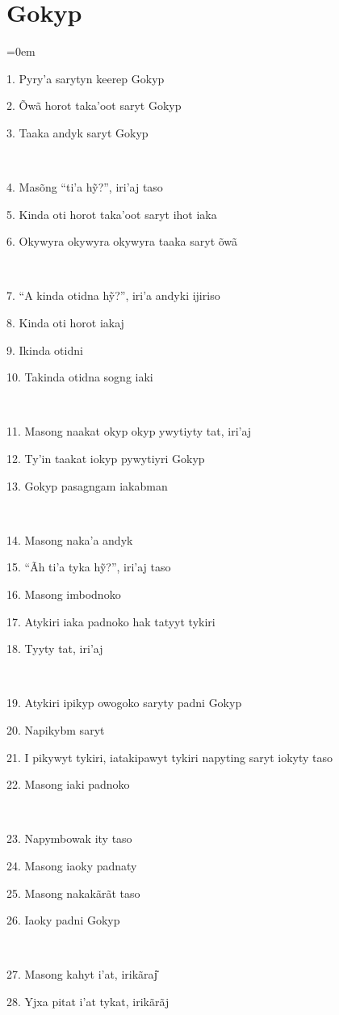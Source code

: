 \chapter*{Gokyp}\parindent=0em

1. Pyry'a sarytyn keerep Gokyp

2. Õwã horot taka'oot saryt Gokyp

3. Taaka andyk saryt Gokyp

~

4. Masõng ``ti'a hỹ?'', iri'aj taso

5. Kinda oti horot taka'oot saryt ihot iaka

6. Okywyra okywyra okywyra taaka saryt õwã

~

7. ``A kinda otidna hỹ?'', iri'a andyki ijiriso

8. Kinda oti horot iakaj

9. Ikinda otidni

10. Takinda otidna sogng iaki

~

11. Masong naakat okyp okyp ywytiyty tat, iri'aj

12. Ty'in taakat iokyp pywytiyri Gokyp

13. Gokyp pasagngam iakabman

~

14. Masong naka'a andyk

15. ``Ãh ti'a tyka hỹ?'', iri'aj taso

16. Masong imbodnoko

17. Atykiri iaka padnoko hak tatyyt tykiri

18. Tyyty tat, iri'aj

~

19. Atykiri ipikyp owogoko saryty padni Gokyp

20. Napikybm saryt

21. I pikywyt tykiri, iatakipawyt tykiri napyting saryt iokyty taso

22. Masong iaki padnoko

~

23. Napymbowak ity taso

24. Masong iaoky padnaty

25. Masong nakakãrãt taso

26. Iaoky padni Gokyp

~

27. Masong kahyt i'at, irikãraj͂

28. Yjxa pitat i'at tykat, irikãrãj

